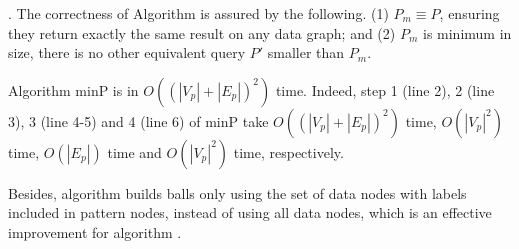 . The correctness of Algorithm \minp is assured by the following. (1) $P_m \equiv P$, ensuring they return exactly the same result on any data graph; and (2) $P_m$ is minimum in size, \ie there is no other equivalent query $P'$ smaller than $P_m$.

Algorithm minP is in $O((|V_p|+|E_p|)^2)$ time. Indeed, step 1 (line 2), 2 (line 3), 3 (line 4-5) and 4 (line 6) of minP take $O((|V_p|+|E_p|)^2)$ time, $O(|V_p|^2)$ time, $O(|E_p|)$ time and $O(|V_p|^2)$ time, respectively.

Besides, algorithm \grouprecopt builds balls only using the set of data nodes with labels included in pattern nodes, instead of using all data nodes, which is an effective improvement for algorithm \grouprec.

